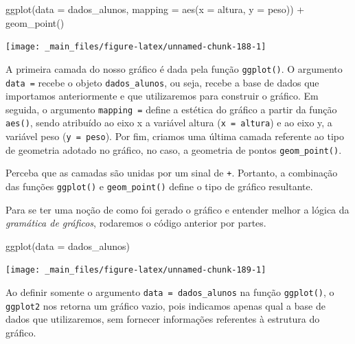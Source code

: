 \documentclass[
  brazilian,
]{book}
\newenvironment{Shaded}{\begin{snugshade}}{\end{snugshade}}
\newcommand{\AttributeTok}[1]{\textcolor[rgb]{0.77,0.63,0.00}{#1}}
\newcommand{\FunctionTok}[1]{\textcolor[rgb]{0.00,0.00,0.00}{#1}}
\newcommand{\NormalTok}[1]{#1}
\newcommand{\SpecialCharTok}[1]{\textcolor[rgb]{0.00,0.00,0.00}{#1}}
\begin{document}
\begin{Shaded}
\begin{Highlighting}[]
\FunctionTok{ggplot}\NormalTok{(}\AttributeTok{data =}\NormalTok{ dados\_alunos,}
       \AttributeTok{mapping =} \FunctionTok{aes}\NormalTok{(}\AttributeTok{x =}\NormalTok{ altura,}
                     \AttributeTok{y =}\NormalTok{ peso)) }\SpecialCharTok{+}
  \FunctionTok{geom\_point}\NormalTok{()}
\end{Highlighting}
\end{Shaded}

\begin{center}\texttt{[image: \_main\_files/figure-latex/unnamed-chunk-188-1]} \end{center}

A primeira camada do nosso gráfico é dada pela função \texttt{ggplot()}. O argumento \texttt{data\ =} recebe o objeto \texttt{dados\_alunos}, ou seja, recebe a base de dados que importamos anteriormente e que utilizaremos para construir o gráfico. Em seguida, o argumento \texttt{mapping\ =} define a estética do gráfico a partir da função \texttt{aes()}, sendo atribuído ao eixo x a variável altura (\texttt{x\ =\ altura}) e ao eixo y, a variável peso (\texttt{y\ =\ peso}). Por fim, criamos uma última camada referente ao tipo de geometria adotado no gráfico, no caso, a geometria de pontos \texttt{geom\_point()}.

Perceba que as camadas são unidas por um sinal de \texttt{+}. Portanto, a combinação das funções \texttt{ggplot()} e \texttt{geom\_point()} define o tipo de gráfico resultante.

Para se ter uma noção de como foi gerado o gráfico e entender melhor a lógica da \emph{gramática de gráficos}, rodaremos o código anterior por partes.

\begin{Shaded}
\begin{Highlighting}[]
\FunctionTok{ggplot}\NormalTok{(}\AttributeTok{data =}\NormalTok{ dados\_alunos)}
\end{Highlighting}
\end{Shaded}

\begin{center}\texttt{[image: \_main\_files/figure-latex/unnamed-chunk-189-1]} \end{center}

Ao definir somente o argumento \texttt{data\ =\ dados\_alunos} na função \texttt{ggplot()}, o \texttt{ggplot2} nos retorna um gráfico vazio, pois indicamos apenas qual a base de dados que utilizaremos, sem fornecer informações referentes à estrutura do gráfico.
\end{document}
